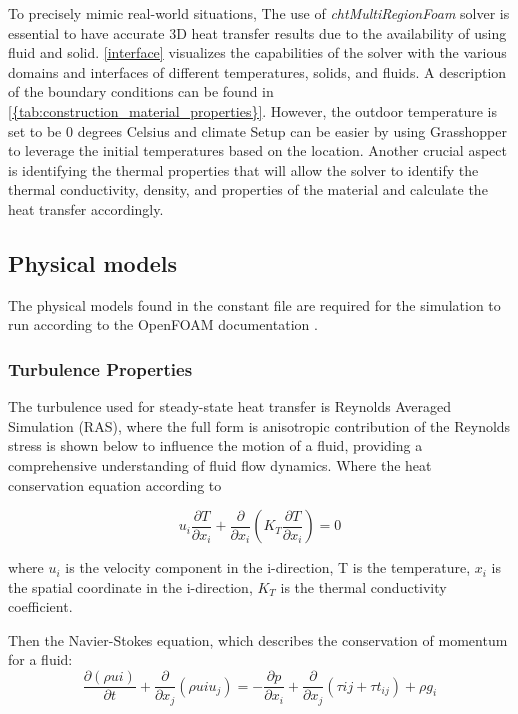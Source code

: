 To precisely mimic real-world situations, The use of \textit{chtMultiRegionFoam} solver is essential to have accurate 3D heat transfer results due to the availability of using fluid and solid. \ref{interface} visualizes the capabilities of the solver with the various domains and interfaces of different temperatures, solids, and fluids. 
A description of the boundary conditions can be found in \cref{{tab:construction_material_properties}}. 
However, the outdoor temperature is set to be 0 degrees Celsius and climate Setup can be easier by using Grasshopper to leverage the initial temperatures based on the location. 
Another crucial aspect is identifying the thermal properties that will allow the solver to identify the thermal conductivity, density, and properties of the material and calculate the heat transfer accordingly.


\subsection{Physical models}
The physical models found in the constant file are required for the simulation to run according to the OpenFOAM documentation \cite{OFD}.

\subsubsection{Turbulence Properties}
The turbulence used for steady-state heat transfer is Reynolds Averaged Simulation (RAS), where the full form is anisotropic contribution of the Reynolds stress is shown below to influence the motion of a fluid, providing a comprehensive understanding of fluid flow dynamics. Where the heat conservation equation according to \cite{hce}

\begin{equation}
u_i \frac{\partial T}{\partial x_i} + \frac{\partial}{\partial x_i}(K_T \frac{\partial T}{\partial x_i}) = 0 \label{eq:heat}
\end{equation}

where $u_i$ is the velocity component in the i-direction, T is the temperature, $x_i$ is the spatial coordinate in the i-direction, $K_T$ is the thermal conductivity coefficient.


Then the Navier-Stokes equation, which describes the conservation of momentum for a fluid:
\begin{equation}
\frac{\partial (\rho {u}i)}{\partial t} + \frac{\partial}{\partial x_j} \left( \rho {u}i u_j \right) = -\frac{\partial p}{\partial x_i} + \frac{\partial}{\partial x_j} \left( \tau{ij} + \tau{t_{ij}} \right) + \rho g_i
\end{equation}




